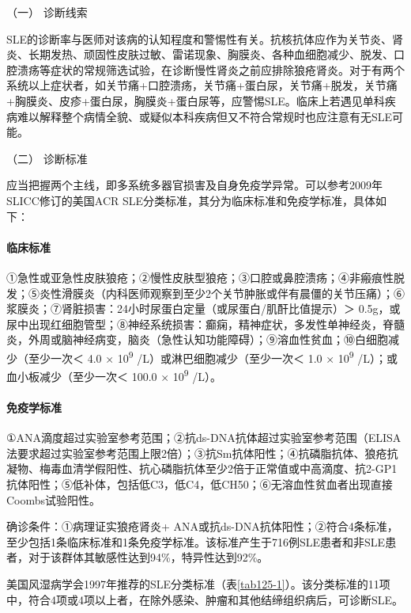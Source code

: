 \hypertarget{text00347.htmlux5cux23CHP14-1-2-3-1}{}
（一） 诊断线索

SLE的诊断率与医师对该病的认知程度和警惕性有关。抗核抗体应作为关节炎、肾炎、长期发热、顽固性皮肤过敏、雷诺现象、胸膜炎、各种血细胞减少、脱发、口腔溃疡等症状的常规筛选试验，在诊断慢性肾炎之前应排除狼疮肾炎。对于有两个系统以上症状者，如关节痛+口腔溃疡，关节痛+蛋白尿，关节痛+脱发，关节痛+胸膜炎、皮疹+蛋白尿，胸膜炎+蛋白尿等，应警惕SLE。临床上若遇见单科疾病难以解释整个病情全貌、或疑似本科疾病但又不符合常规时也应注意有无SLE可能。

\hypertarget{text00347.htmlux5cux23CHP14-1-2-3-2}{}
（二） 诊断标准

应当把握两个主线，即多系统多器官损害及自身免疫学异常。可以参考2009年SLICC修订的美国ACR
SLE分类标准，其分为临床标准和免疫学标准，具体如下：

\paragraph{临床标准}

①急性或亚急性皮肤狼疮；②慢性皮肤型狼疮；③口腔或鼻腔溃疡；④非瘢痕性脱发；⑤炎性滑膜炎（内科医师观察到至少2个关节肿胀或伴有晨僵的关节压痛）；⑥浆膜炎；⑦肾脏损害：24小时尿蛋白定量（或尿蛋白/肌酐比值提示）＞
0.5g，或尿中出现红细胞管型；⑧神经系统损害：癫痫，精神症状，多发性单神经炎，脊髓炎，外周或脑神经病变，脑炎（急性认知功能障碍）；⑨溶血性贫血；⑩白细胞减少（至少一次＜
4.0 × 10\textsuperscript{9} /L）或淋巴细胞减少（至少一次＜ 1.0 ×
10\textsuperscript{9} /L）；或血小板减少（至少一次＜ 100.0 ×
10\textsuperscript{9} /L）。

\paragraph{免疫学标准}

①ANA滴度超过实验室参考范围；②抗ds-DNA抗体超过实验室参考范围（ELISA法要求超过实验室参考范围上限2倍）；③抗Sm抗体阳性；④抗磷脂抗体、狼疮抗凝物、梅毒血清学假阳性、抗心磷脂抗体至少2倍于正常值或中高滴度、抗2-GP1抗体阳性；⑤低补体，包括低C3，低C4，低CH50；⑥无溶血性贫血者出现直接Coombs试验阳性。

确诊条件：①病理证实狼疮肾炎+
ANA或抗ds-DNA抗体阳性；②符合4条标准，至少包括1条临床标准和1条免疫学标准。该标准产生于716例SLE患者和非SLE患者，对于该群体其敏感性达到94\%，特异性达到92\%。

美国风湿病学会1997年推荐的SLE分类标准（表\ref{tab125-1}）。该分类标准的11项中，符合4项或4项以上者，在除外感染、肿瘤和其他结缔组织病后，可诊断SLE。

